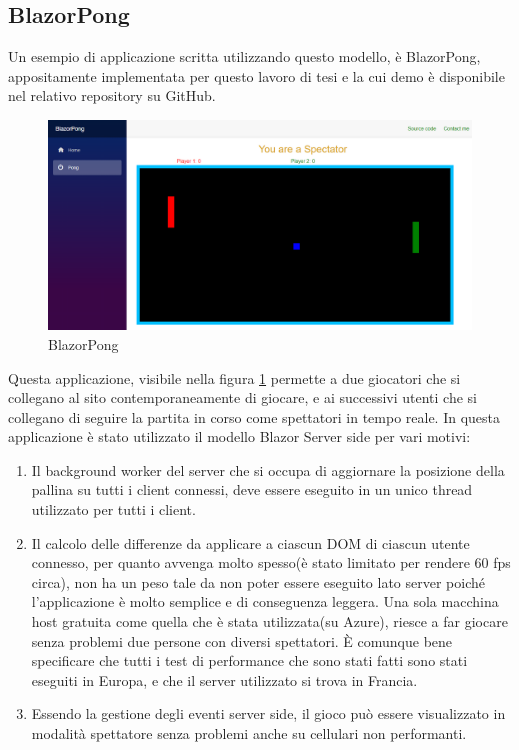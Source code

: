\subsection{BlazorPong }\label{sez:bpong}
Un esempio di applicazione scritta utilizzando questo modello, \`e BlazorPong, appositamente implementata per questo lavoro di tesi e la cui demo \`e disponibile nel relativo repository su GitHub\cite{blazorPong}.

\begin{figure}[H]
	\centerline{\includegraphics[scale=0.3]{figure/BlazorPong.PNG}}
	\caption{BlazorPong}
	\label{fig:BlazorPong}
\end{figure}

Questa applicazione, visibile nella figura \ref{fig:BlazorPong} permette a due giocatori che si collegano al sito contemporaneamente di giocare, e ai successivi utenti che si collegano di seguire la partita in corso come spettatori in tempo reale.
In questa applicazione \`e stato utilizzato il modello Blazor Server side per vari motivi:
\begin{enumerate}
	\item Il background worker del server che si occupa di aggiornare la posizione della pallina su tutti i client connessi, deve essere eseguito in un unico thread utilizzato per tutti i client.
	\item Il calcolo delle differenze da applicare a ciascun DOM di ciascun utente connesso, per quanto avvenga molto spesso(\`e stato limitato per rendere 60 fps circa), non ha un peso tale da non poter essere eseguito lato server poich\'e l'applicazione \`e molto semplice e di conseguenza leggera.
	Una sola macchina host gratuita come quella che \`e stata utilizzata(su Azure), riesce a far giocare senza problemi due persone con diversi spettatori.
	\`E comunque bene specificare che tutti i test di performance che sono stati fatti sono stati eseguiti in Europa, e che il server utilizzato si trova in Francia.
	\item Essendo la gestione degli eventi server side, il gioco pu\`o essere visualizzato in modalit\`a spettatore senza problemi anche su cellulari non performanti.
\end{enumerate}

